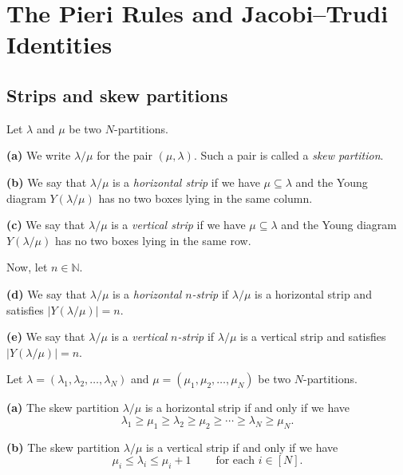\section{The Pieri Rules and Jacobi--Trudi Identities}

\subsection{Strips and skew partitions}

\begin{definition}
\label{def.sf.strips}
\leantarget
\leanok
Let $\lambda$ and $\mu$ be two $N$-partitions.

\textbf{(a)} We write $\lambda/\mu$ for the pair $\left(  \mu,\lambda\right)
$. Such a pair is called a \emph{skew partition}.

\textbf{(b)} We say that $\lambda/\mu$ is a \emph{horizontal strip} if we have
$\mu\subseteq\lambda$ and the Young diagram $Y\left(  \lambda/\mu\right)  $
has no two boxes lying in the same column.

\textbf{(c)} We say that $\lambda/\mu$ is a \emph{vertical strip} if we have
$\mu\subseteq\lambda$ and the Young diagram $Y\left(  \lambda/\mu\right)  $
has no two boxes lying in the same row.

Now, let $n\in\mathbb{N}$.

\textbf{(d)} We say that $\lambda/\mu$ is a \emph{horizontal }$n$\emph{-strip}
if $\lambda/\mu$ is a horizontal strip and satisfies $\left\vert Y\left(
\lambda/\mu\right)  \right\vert =n$.

\textbf{(e)} We say that $\lambda/\mu$ is a \emph{vertical }$n$\emph{-strip}
if $\lambda/\mu$ is a vertical strip and satisfies $\left\vert Y\left(
\lambda/\mu\right)  \right\vert =n$.
\end{definition}

\begin{proposition}
\label{prop.sf.strips.entries}
\leantarget
\leanok
Let $\lambda=\left(  \lambda_{1},\lambda
_{2},\ldots,\lambda_{N}\right)  $ and $\mu=\left(  \mu_{1},\mu_{2},\ldots
,\mu_{N}\right)  $ be two $N$-partitions.

\textbf{(a)} The skew partition $\lambda/\mu$ is a horizontal strip if and
only if we have%
\[
\lambda_{1}\geq\mu_{1}\geq\lambda_{2}\geq\mu_{2}\geq\cdots\geq\lambda_{N}%
\geq\mu_{N}.
\]


\textbf{(b)} The skew partition $\lambda/\mu$ is a vertical strip if and only
if we have%
\[
\mu_{i}\leq\lambda_{i}\leq\mu_{i}+1\ \ \ \ \ \ \ \ \ \ \text{for each }%
i\in\left[  N\right]  .
\]
\end{proposition}

